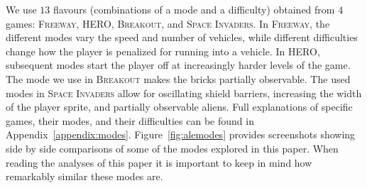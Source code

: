 \documentclass{article}
\begin{document}
We use $13$ flavours (combinations of a mode and a difficulty) obtained from $4$ games: \textsc{Freeway}, \textsc{HERO}, \textsc{Breakout}, and \textsc{Space Invaders}.
In \textsc{Freeway}, the different modes vary the speed and number of vehicles, while different difficulties change how the player is penalized for running into a vehicle. In \textsc{HERO}, subsequent modes start the player off at increasingly harder levels of the game. The mode we use in \textsc{Breakout} makes the bricks partially observable. The used modes in \textsc{Space Invaders} allow for oscillating shield barriers, increasing the width of the player sprite, and partially observable aliens. Full explanations of specific games, their modes, and their difficulties can be found in Appendix~\ref{appendix:modes}. Figure~\ref{fig:alemodes} provides screenshots showing side by side comparisons of some of the modes explored in this paper. When reading the analyses of this paper it is important to keep in mind how remarkably similar these modes are.
\end{document}
